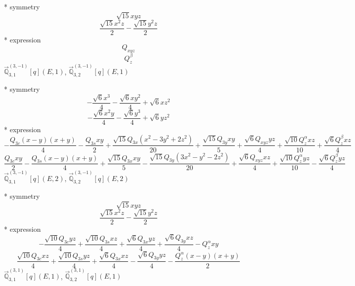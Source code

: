 \documentclass[fleqn,8pt]{jsarticle}
\begin{document}
\noindent\quad ** symmetry
\begin{dmath*}
\sqrt{15} x y z
\end{dmath*}
\begin{dmath*}
\frac{\sqrt{15} x^{2} z}{2} - \frac{\sqrt{15} y^{2} z}{2}
\end{dmath*}
\noindent\quad ** expression
\begin{dmath*}
Q_{xyz}
\end{dmath*}
\begin{dmath*}
Q_{z}^{\beta}
\end{dmath*}
\noindent\quad $\vec{\mathbb{Q}}_{3,1}^{(3,-1)}[q](E,1)$, $\vec{\mathbb{Q}}_{3,2}^{(3,-1)}[q](E,1)$

\noindent\quad ** symmetry
\begin{dmath*}
- \frac{\sqrt{6} x^{3}}{4} - \frac{\sqrt{6} x y^{2}}{4} + \sqrt{6} x z^{2}
\end{dmath*}
\begin{dmath*}
- \frac{\sqrt{6} x^{2} y}{4} - \frac{\sqrt{6} y^{3}}{4} + \sqrt{6} y z^{2}
\end{dmath*}
\noindent\quad ** expression
\begin{dmath*}
- \frac{Q_{3c} \left(x - y\right) \left(x + y\right)}{4} - \frac{Q_{3s} x y}{2} + \frac{\sqrt{15} Q_{3x} \left(x^{2} - 3 y^{2} + 2 z^{2}\right)}{20} + \frac{\sqrt{15} Q_{3y} x y}{5} + \frac{\sqrt{6} Q_{xyz} y z}{4} + \frac{\sqrt{10} Q_{z}^{\alpha} x z}{10} + \frac{\sqrt{6} Q_{z}^{\beta} x z}{4}
\end{dmath*}
\begin{dmath*}
\frac{Q_{3c} x y}{2} - \frac{Q_{3s} \left(x - y\right) \left(x + y\right)}{4} + \frac{\sqrt{15} Q_{3x} x y}{5} - \frac{\sqrt{15} Q_{3y} \left(3 x^{2} - y^{2} - 2 z^{2}\right)}{20} + \frac{\sqrt{6} Q_{xyz} x z}{4} + \frac{\sqrt{10} Q_{z}^{\alpha} y z}{10} - \frac{\sqrt{6} Q_{z}^{\beta} y z}{4}
\end{dmath*}
\noindent\quad $\vec{\mathbb{Q}}_{3,1}^{(3,-1)}[q](E,2)$, $\vec{\mathbb{Q}}_{3,2}^{(3,-1)}[q](E,2)$

\noindent\quad ** symmetry
\begin{dmath*}
\sqrt{15} x y z
\end{dmath*}
\begin{dmath*}
\frac{\sqrt{15} x^{2} z}{2} - \frac{\sqrt{15} y^{2} z}{2}
\end{dmath*}
\noindent\quad ** expression
\begin{dmath*}
- \frac{\sqrt{10} Q_{3c} y z}{4} + \frac{\sqrt{10} Q_{3s} x z}{4} + \frac{\sqrt{6} Q_{3x} y z}{4} + \frac{\sqrt{6} Q_{3y} x z}{4} - Q_{z}^{\alpha} x y
\end{dmath*}
\begin{dmath*}
\frac{\sqrt{10} Q_{3c} x z}{4} + \frac{\sqrt{10} Q_{3s} y z}{4} + \frac{\sqrt{6} Q_{3x} x z}{4} - \frac{\sqrt{6} Q_{3y} y z}{4} - \frac{Q_{z}^{\alpha} \left(x - y\right) \left(x + y\right)}{2}
\end{dmath*}
\noindent\quad $\vec{\mathbb{Q}}_{3,1}^{(3,1)}[q](E,1)$, $\vec{\mathbb{Q}}_{3,2}^{(3,1)}[q](E,1)$
\end{document}
